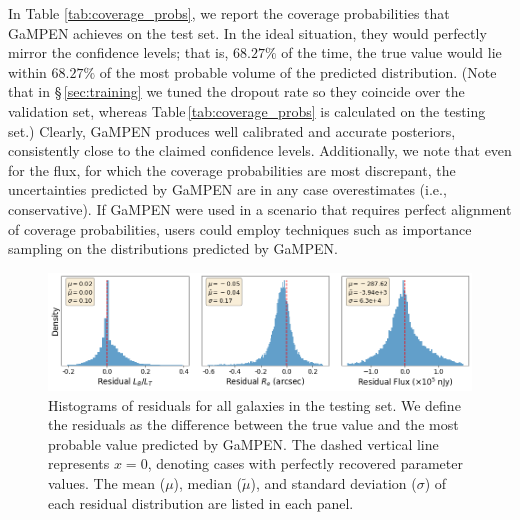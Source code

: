 \documentclass[twocolumn]{aastex63}
\newcommand\gampen{GaMPEN}
\begin{document}
\begin{CJK*}{UTF8}{gbsn}
In Table \ref{tab:coverage_probs}, we report the coverage probabilities that \gampen{} achieves on the test set. 
In the ideal situation, they would perfectly mirror the confidence levels; that is, $68.27\%$ of the time, the true value would lie within $68.27\%$ of the most probable volume of the predicted distribution.
(Note that in \S\,\ref{sec:training} we tuned the dropout rate so they coincide over the validation set, whereas Table\,\ref{tab:coverage_probs} is calculated on the testing set.) 
Clearly, \gampen{} produces well calibrated and accurate posteriors, 
consistently close to the claimed confidence levels.
Additionally, we note that even for the flux, for which the coverage probabilities are most discrepant, the uncertainties predicted by \gampen{} are in any case overestimates (i.e., conservative). %
If \gampen{} were used in a scenario that requires perfect alignment of coverage probabilities, users could employ techniques such as importance sampling \citep{importance_sampling} on the distributions predicted by \gampen{}. 

\begin{figure}[htb]
    \centering
    \includegraphics[width
    =\textwidth]{residual_hists.png}
    \caption{Histograms of residuals for all galaxies in the testing set. We define the residuals as the difference between the true value and the most probable value predicted by \gampen{}. The dashed vertical line represents $x = 0$, denoting cases with perfectly recovered parameter values. 
    The mean ($\mu$), median ($\tilde{\mu}$), and standard deviation ($\sigma$) of each residual distribution are listed in each panel.
    }
    \label{fig:residual_hists}
\end{figure}


\end{CJK*}
\end{document}
